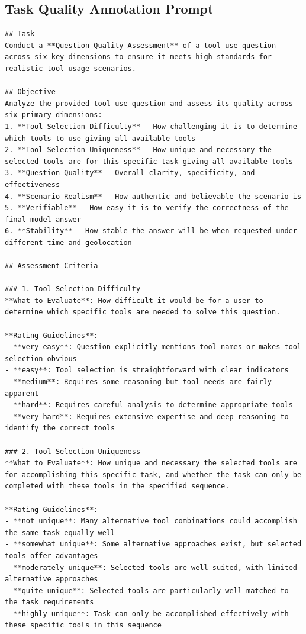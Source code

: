 \subsection{Task Quality Annotation Prompt}
\label{app:task-annotation-prompt-for-single-server}
\begin{verbatim}
## Task
Conduct a **Question Quality Assessment** of a tool use question across six key dimensions to ensure it meets high standards for realistic tool usage scenarios.

## Objective
Analyze the provided tool use question and assess its quality across six primary dimensions:
1. **Tool Selection Difficulty** - How challenging it is to determine which tools to use giving all available tools
2. **Tool Selection Uniqueness** - How unique and necessary the selected tools are for this specific task giving all available tools
3. **Question Quality** - Overall clarity, specificity, and effectiveness 
4. **Scenario Realism** - How authentic and believable the scenario is
5. **Verifiable** - How easy it is to verify the correctness of the final model answer
6. **Stability** - How stable the answer will be when requested under different time and geolocation

## Assessment Criteria

### 1. Tool Selection Difficulty
**What to Evaluate**: How difficult it would be for a user to determine which specific tools are needed to solve this question.

**Rating Guidelines**:
- **very easy**: Question explicitly mentions tool names or makes tool selection obvious
- **easy**: Tool selection is straightforward with clear indicators
- **medium**: Requires some reasoning but tool needs are fairly apparent  
- **hard**: Requires careful analysis to determine appropriate tools
- **very hard**: Requires extensive expertise and deep reasoning to identify the correct tools

### 2. Tool Selection Uniqueness
**What to Evaluate**: How unique and necessary the selected tools are for accomplishing this specific task, and whether the task can only be completed with these tools in the specified sequence.

**Rating Guidelines**:
- **not unique**: Many alternative tool combinations could accomplish the same task equally well
- **somewhat unique**: Some alternative approaches exist, but selected tools offer advantages
- **moderately unique**: Selected tools are well-suited, with limited alternative approaches
- **quite unique**: Selected tools are particularly well-matched to the task requirements
- **highly unique**: Task can only be accomplished effectively with these specific tools in this sequence


\end{verbatim}
